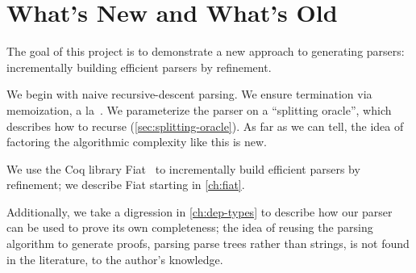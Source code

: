 \section{What's New and What's Old} \label{sec:new} \label{sec:goals}
  The goal of this project is to demonstrate a new approach to generating parsers: incrementally building efficient parsers by refinement.
  
  We begin with naive recursive-descent parsing.  We ensure termination via memoization, a la~\cite{Ridge}.  We parameterize the parser on a ``splitting oracle'', which describes how to recurse (\autoref{sec:splitting-oracle}).  As far as we can tell, the idea of factoring the algorithmic complexity like this is new.
  
  We use the Coq library Fiat~\cite{delaware2015fiat} to incrementally build efficient parsers by refinement; we describe Fiat starting in \autoref{ch:fiat}.
  
  Additionally, we take a digression in \autoref{ch:dep-types} to describe how our parser can be used to prove its own completeness; the idea of reusing the parsing algorithm to generate proofs, parsing parse trees rather than strings, is not found in the literature, to the author's knowledge.

